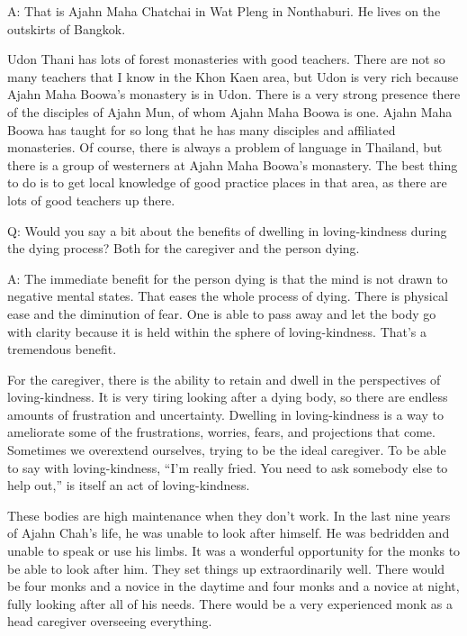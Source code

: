 \vspace{\the\qaskip}
A: That is Ajahn Maha Chatchai in Wat Pleng in Nonthaburi. He lives on
the outskirts of Bangkok.

Udon Thani has lots of forest monasteries with good teachers. There are
not so many teachers that I know in the Khon Kaen area, but Udon is very
rich because Ajahn Maha Boowa’s monastery is in Udon. There is a very
strong presence there of the disciples of Ajahn Mun, of whom Ajahn Maha
Boowa is one. Ajahn Maha Boowa has taught for so long that he has many
disciples and affiliated monasteries. Of course, there is always a
problem of language in Thailand, but there is a group of westerners at
Ajahn Maha Boowa’s monastery. The best thing to do is to get local
knowledge of good practice places in that area, as there are lots of
good teachers up there.

\vspace{\the\qaskip}
Q: Would you say a bit about the benefits of dwelling in loving-kindness
during the dying process? Both for the caregiver and the person dying.

\vspace{\the\qaskip}
A: The immediate benefit for the person dying is that the mind is not
drawn to negative mental states. That eases the whole process of dying.
There is physical ease and the diminution of fear. One is able to pass
away and let the body go with clarity because it is held within the
sphere of loving-kindness. That’s a tremendous benefit.

For the caregiver, there is the ability to retain and dwell in the
perspectives of loving-kindness. It is very tiring looking after a dying
body, so there are endless amounts of frustration and uncertainty.
Dwelling in loving-kindness is a way to ameliorate some of the
frustrations, worries, fears, and projections that come. Sometimes we
overextend ourselves, trying to be the ideal caregiver. To be able to
say with loving-kindness, “I’m really fried. You need to ask somebody
else to help out,” is itself an act of loving-kindness.

These bodies are high maintenance when they don’t work. In the last nine
years of Ajahn Chah’s life, he was unable to look after himself. He was
bedridden and unable to speak or use his limbs. It was a wonderful
opportunity for the monks to be able to look after him. They set things
up extraordinarily well. There would be four monks and a novice in the
daytime and four monks and a novice at night, fully looking after all of
his needs. There would be a very experienced monk as a head caregiver
overseeing everything.


